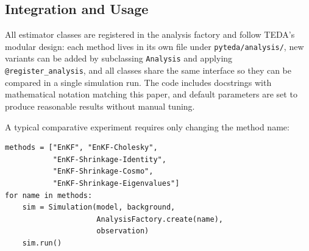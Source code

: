 \subsection{Integration and Usage}
\label{sec:integration}

All estimator classes are registered in the analysis factory and follow TEDA's modular design: each method lives in its own file under \texttt{pyteda/analysis/}, new variants can be added by subclassing \texttt{Analysis} and applying \texttt{@register\_analysis}, and all classes share the same interface so they can be compared in a single simulation run. The code includes docstrings with mathematical notation matching this paper, and default parameters are set to produce reasonable results without manual tuning.

A typical comparative experiment requires only changing the method name:
\begin{verbatim}
methods = ["EnKF", "EnKF-Cholesky",
           "EnKF-Shrinkage-Identity",
           "EnKF-Shrinkage-Cosmo",
           "EnKF-Shrinkage-Eigenvalues"]
for name in methods:
    sim = Simulation(model, background,
                     AnalysisFactory.create(name),
                     observation)
    sim.run()
\end{verbatim}

